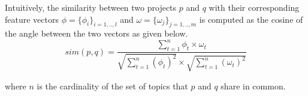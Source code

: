 Intuitively, the similarity between two projects $p$ and $q$ with their corresponding feature vectors $\phi=\{\phi_{i}\}_{i=1,..,l}$ and $\omega=\{\omega_{j}\}_{j=1,..,m}$ is computed as the cosine of the angle between the two vectors as given below. %
\begin{equation} \label{eqn:VsmSim}
sim(p,q)=\frac{\sum_{t=1}^{n}\phi_{t}\times \omega_{t}}{\sqrt{\sum_{t=1}^{n}(\phi_{t})^{2} }\times \sqrt{\sum_{t=1}^{n}(\omega_{t})^{2}}} 
\end{equation}

where $n$ is the cardinality of the set of topics that $p$ and $q$ share in common.%







